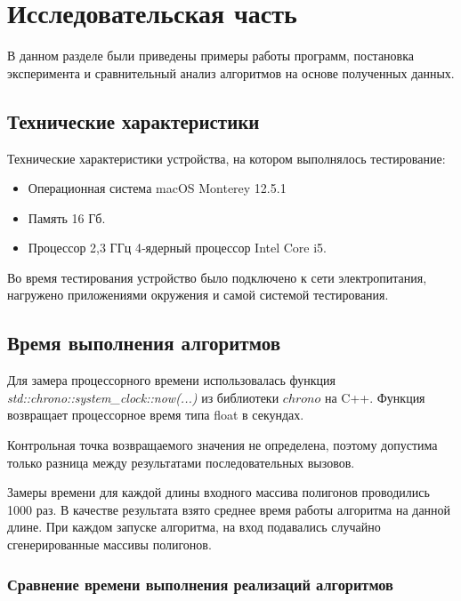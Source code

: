 \chapter{Исследовательская часть}

В данном разделе были приведены примеры работы программ, постановка эксперимента и сравнительный анализ алгоритмов на основе полученных данных.

\section{Технические характеристики}

Технические характеристики устройства, на котором выполнялось тестирование:

\begin{itemize}
	\item Операционная система macOS Monterey 12.5.1 
	\item Память 16 Гб.
	\item Процессор 2,3 ГГц 4‑ядерный процессор Intel Core i5.
\end{itemize}

Во время тестирования устройство было подключено к сети электропитания, нагружено приложениями окружения и самой  системой тестирования.

\section{Время выполнения алгоритмов}

Для \hfill замера \hfill процессорного \hfill времени \hfill использовалась \hfill функция 
\\ \textit{std::chrono::system\_clock::now(...)} из библиотеки $chrono$ \cite{cpp-lang-chrono} на C++. Функция возвращает процессорное время типа float в секундах.

Контрольная точка возвращаемого значения не определена, поэтому допустима только разница между результатами последовательных вызовов.

Замеры времени для каждой длины входного массива полигонов проводились 1000 раз. В качестве результата взято среднее время работы алгоритма на данной длине. При каждом запуске алгоритма, на вход подавались случайно сгенерированные массивы полигонов. 

\subsection*{Сравнение времени выполнения реализаций алгоритмов}

